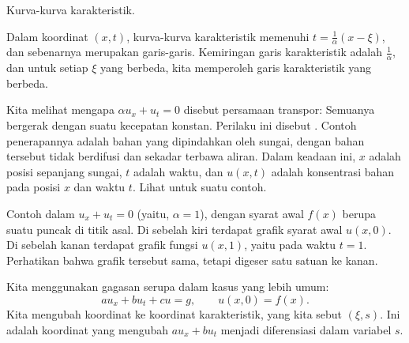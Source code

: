 \begin{example}
\begin{mywrapfig}{2.8in}
\capstart
{}
\caption{Kurva-kurva karakteristik.\label{fopde:charcurves}}
\end{mywrapfig}

Dalam koordinat $(x,t)$, kurva-kurva karakteristik memenuhi
$t = \frac{1}{\alpha} ( x- \xi)$, dan sebenarnya merupakan garis-garis.
Kemiringan garis karakteristik adalah
$\frac{1}{\alpha}$, dan untuk setiap $\xi$ yang berbeda, kita memperoleh garis
karakteristik yang berbeda.

Kita melihat mengapa $\alpha u_x + u_t = 0$ disebut
persamaan transpor: Semuanya bergerak dengan suatu kecepatan konstan.
Perilaku ini disebut \emph{}.
Contoh penerapannya adalah bahan yang dipindahkan oleh sungai, dengan bahan tersebut
tidak berdifusi dan sekadar terbawa aliran.  Dalam keadaan ini, $x$ adalah
posisi sepanjang sungai, $t$ adalah waktu, dan $u(x,t)$ adalah
konsentrasi
bahan pada posisi $x$ dan waktu $t$.  Lihat
 untuk suatu contoh.
\begin{myfig}
\capstart
\caption{Contoh 
dalam $u_x+u_t = 0$ (yaitu, $\alpha = 1$), dengan
syarat awal $f(x)$ berupa suatu puncak di titik asal.  Di sebelah kiri terdapat grafik
syarat awal $u(x,0)$.  Di sebelah kanan terdapat grafik
fungsi $u(x,1)$, yaitu pada waktu $t=1$.  Perhatikan bahwa grafik tersebut sama,
tetapi digeser satu satuan ke
kanan.\label{fopde:transportfig}}
\end{myfig}
\end{example}

Kita menggunakan gagasan serupa dalam kasus yang lebih umum:
\begin{equation*}
a u_x + b u_t + c u = g, \qquad u(x,0) = f(x)  .
\end{equation*}
Kita mengubah koordinat ke
koordinat karakteristik, yang kita sebut $(\xi,s)$.
Ini adalah koordinat yang mengubah $a u_x + b u_t$ menjadi diferensiasi
dalam variabel $s$.

